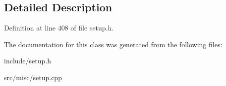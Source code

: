 \subsection{Detailed Description}


Definition at line 408 of file setup.\-h.



The documentation for this class was generated from the following files\-:\begin{DoxyCompactItemize}
\item 
include/setup.\-h\item 
src/misc/setup.\-cpp\end{DoxyCompactItemize}
